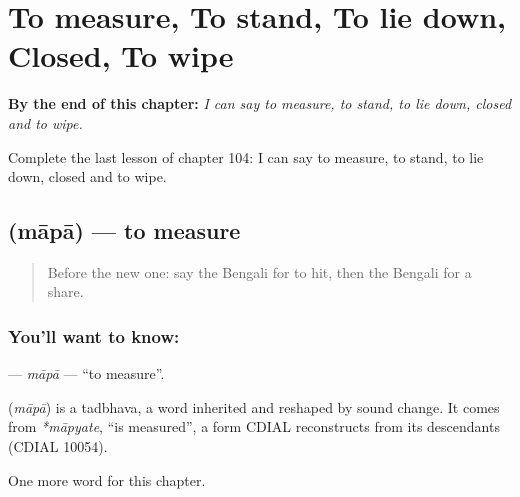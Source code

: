 
\chapter{To measure, To stand, To lie down, Closed, To wipe}
\label{ch:bn-to-measure-to-stand-to-lie-down-closed-to-wipe}

\begin{chapteropening}
\textbf{By the end of this chapter:} \emph{I can say to measure, to stand, to lie down, closed and to wipe.}

Complete the last lesson of chapter 104: I can say to measure, to stand, to lie down, closed and to wipe.
\end{chapteropening}

\section[\texorpdfstring{\bn{মাপা} (māpā)}{মাপা (māpā)}]{ (māpā) — to measure}

\label{lesson:BN-C104-mapa}



\begin{quote}
Before the new one: say the Bengali for to hit, then the Bengali for a share.
\end{quote}

\subsection*{You'll want to know: }
\textbf{} — \emph{māpā} — \textquotedblleft{}to measure\textquotedblright{}.

\begin{cousinweb}
\textbf{} (\emph{māpā}) is a tadbhava, a word inherited and reshaped by sound change. It comes from \emph{*māpyate}, \textquotedblleft{}is measured\textquotedblright{}, a form CDIAL reconstructs from its descendants (CDIAL 10054).
\end{cousinweb}

\begin{grammarlens}[title={What you've built}]
One more word for this chapter.
\end{grammarlens}

